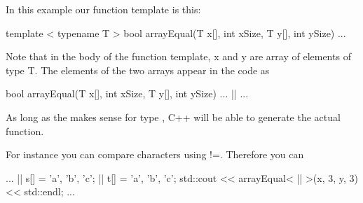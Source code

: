 In this example our function template is this:

\begin{consolethree}[escapeinside=||]
template < typename T >
bool arrayEqual(T x[], int xSize, T y[], int ySize)
{
    ...
}
\end{consolethree}

Note that in the body of the function template, x and y are array of
elements of type T. The elements of the two arrays appear in the code as

\begin{consolethree}[escapeinside=||]
bool arrayEqual(T x[], int xSize, T y[], int ySize)
{
    ...
    ||
    ...
}
\end{consolethree}

As long as the \EMPHASIZE{!=} makes sense for type , C++ will be able to generate the actual function.

For instance you can compare characters using !=. Therefore you can

\begin{consolethree}[escapeinside=||]
...
|| s[] = {'a', 'b', 'c'};
|| t[] = {'a', 'b', 'c'};
std::cout << arrayEqual< || >(x, 3, y, 3)
          << std::endl;
...
\end{consolethree}




